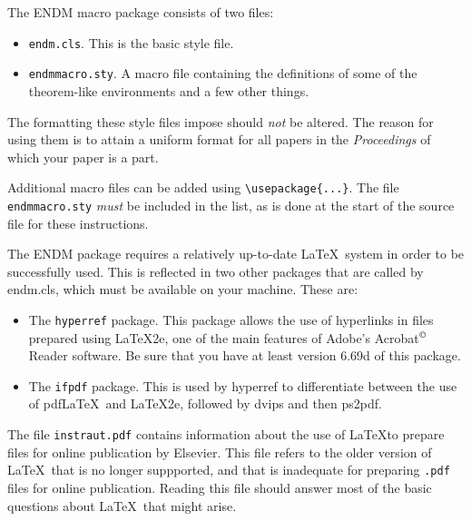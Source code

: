 The ENDM macro package consists of two files:
\begin{itemize}
\item \texttt{endm.cls}. This is the basic style file.
\item \texttt{endmmacro.sty}. A macro file containing the definitions
of some of the theorem-like environments and a few other things.
\end{itemize}

The formatting these style files impose should \emph{not} be altered.
The reason for using them is to attain a uniform format for all papers
in the \emph{Proceedings} of which your paper is a part.

Additional macro files can be added using \verb+\usepackage{...}+.
The file \texttt{endmmacro.sty} \emph{must} be included in the
list, as is done at the start of the source file for these
instructions.

The ENDM package requires a relatively up-to-date \LaTeX\ system in
order to be successfully used. This is reflected in two other packages
that are called by endm.cls, which must be available on your machine.
These are:
\begin{itemize}
\item The \texttt{hyperref} package. This package allows the use of
hyperlinks in files prepared using \LaTeX 2e, one of the main features
of Adobe's Acrobat$^{\copyright}$ Reader software. Be sure that you
have at least version 6.69d of this package.
\item The \texttt{ifpdf} package. This is used by hyperref to
differentiate between the use of pdf\LaTeX\ and \LaTeX 2e, followed
by dvips and then ps2pdf.
\end{itemize}

The file \texttt{instraut.pdf} contains information about the use of
\LaTeX to prepare files for online publication by Elsevier. This file
refers to the older version of \LaTeX\ that is no longer suppported,
and that is inadequate for preparing \texttt{.pdf} files for online
publication. Reading this file should answer most of the basic
questions about \LaTeX\ that might arise.
\fi